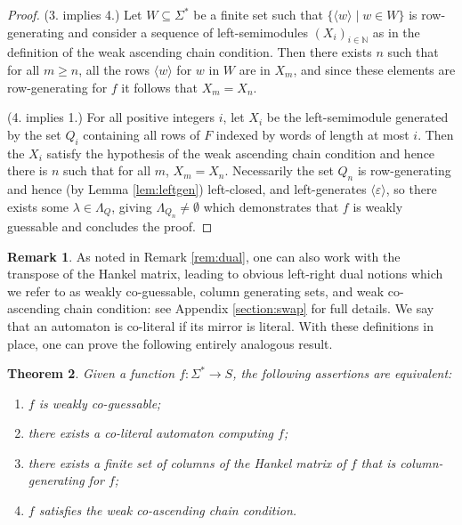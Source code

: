 \documentclass[10pt,a4paper]{amsart}
\newtheorem{thm}{Theorem}[section]
\theoremstyle{definition}
\newtheorem{rem}[thm]{Remark}
\numberwithin{equation}{section}
\numberwithin{theorem}{section}
\begin{document}
\begin{proof}
(3. implies 4.) Let $W \subseteq \Sigma^*$ be a finite set such that $\{\langle w \rangle \mid w \in W\}$ is row-generating and consider a sequence of left-semimodules $(X_i)_{i \in \mathbb{N}}$ as in the definition of the weak ascending chain condition. Then there exists $n$ such that for all $m \geq n$, all the rows $\langle w \rangle$ for $w$ in $W$ are in $X_m$, and since these elements are row-generating for $f$ it follows that $X_m = X_n$.
	
	
(4. implies 1.) For all positive integers $i$, let $X_i$ be the left-semimodule generated by the set $Q_i$ containing all rows of $F$ indexed by words of length at most $i$. Then the $X_i$ satisfy the hypothesis of the weak ascending chain condition and hence there is $n$ such that for all $m$, $X_m = X_n$. Necessarily the set $Q_n$ is row-generating and hence (by Lemma \ref{lem:leftgen}) left-closed, and left-generates $\langle \varepsilon \rangle$, so there exists some $\lambda \in \Lambda_Q$, giving $\Lambda_{Q_n} \neq \emptyset$ which demonstrates that $f$ is weakly guessable and concludes the proof.
\end{proof}


\begin{rem}
\label{rem:dual2}
As noted in Remark \ref{rem:dual}, one can also work with the transpose of the Hankel matrix, leading to obvious left-right dual notions which we refer to as weakly co-guessable, column generating sets, and weak co-ascending chain condition: see Appendix \ref{section:swap} for full details. We say that an automaton is co-literal if its mirror is literal. With these definitions in place, one can prove the following entirely analogous result.
\end{rem}


\begin{thm}
	\label{prop:coweakly}
	Given a function $f:\Sigma^* \to S$, the following assertions are equivalent:
	\begin{enumerate}
		\item $f$ is weakly co-guessable;
		\item there exists a co-literal automaton computing $f$;
		\item there exists a finite set of columns of the Hankel matrix of $f$ that is column-generating for $f$;
		\item $f$ satisfies the weak co-ascending chain condition.
	\end{enumerate}  
\end{thm}
\end{document}
